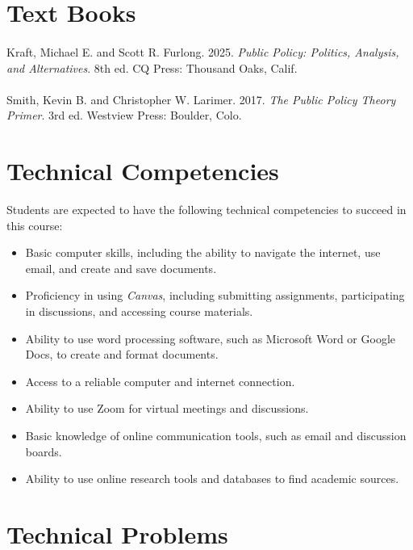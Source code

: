 \documentclass[12pt, letterpaper]{article}
\begin{document}
\section{Text Books}


\paragraph{}\noindent Kraft, Michael E. and Scott R. Furlong. 2025. \emph{Public Policy: Politics, Analysis, and Alternatives}. 8th ed. CQ Press: Thousand Oaks, Calif.

\paragraph{}\noindent Smith, Kevin B. and Christopher W. Larimer. 2017. \emph{The Public Policy Theory Primer}. 3rd ed. Westview Press: Boulder, Colo.

\section{Technical Competencies}

Students are expected to have the following technical competencies to succeed in this course:
\begin{itemize}
    \item Basic computer skills, including the ability to navigate the internet, use email, and create and save documents.
    \item Proficiency in using \emph{Canvas}, including submitting assignments, participating in discussions, and accessing course materials.
    \item Ability to use word processing software, such as Microsoft Word or Google Docs, to create and format documents.
    \item Access to a reliable computer and internet connection.
    \item Ability to use Zoom for virtual meetings and discussions.
    \item Basic knowledge of online communication tools, such as email and discussion boards.
    \item Ability to use online research tools and databases to find academic sources.
\end{itemize}

\section{Technical Problems}
\end{document}
